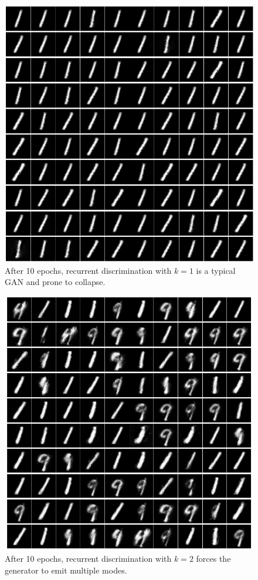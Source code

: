 \documentclass{article}
\begin{document}
\begin{figure}[h]
\caption{After 10 epochs, recurrent discrimination with $k=1$ is a typical GAN and prone to collapse.}
\label{fig:rd1}
\includegraphics[scale=0.3]{images/minibatch1.png}
\centering
\end{figure}
\begin{figure}[h]
\caption{After 10 epochs, recurrent discrimination with $k=2$ forces the generator to emit multiple modes.}
\label{fig:rd2}
\includegraphics[scale=0.3]{images/minibatch2.png}
\centering
\end{figure}
\end{document}
